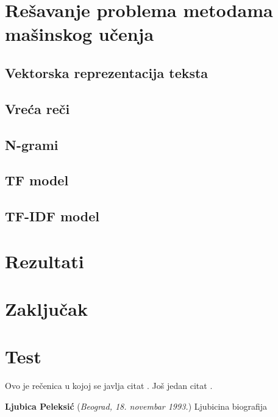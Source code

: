\documentclass[12pt,oneside]{memoir}
\begin{document}
\chapter{Rešavanje problema metodama mašinskog učenja}

\section{Vektorska reprezentacija teksta}
\section{Vreća reči}
\section{N-grami}
\section{TF model}
\section{TF-IDF model}

\chapter{Rezultati}



\chapter{Zaključak}

\chapter{Test}

Ovo je rečenica u kojoj se javlja citat \cite{PetrovicMikic2015}.
Još jedan citat \cite{GuSh:243}.





% 
\literatura

\backmatter


\begin{biografija}
  \textbf{Ljubica Peleksić} (\emph{Beograd,
    18.  novembar 1993.}) 
	Ljubicina biografija
\end{biografija}
\end{document}
